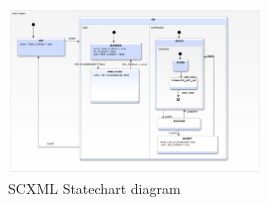 \documentclass{easychair}
\begin{document}










\begin{figure}[]
  \begin{centering}
  \includegraphics[width=0.6\textwidth]{caseStudy/TurnstileSimpleModel}
  \caption{SCXML Statechart diagram}
  \label{fig:StatemachineSCXML}
  \end{centering}
\end{figure} 
\end{document}

